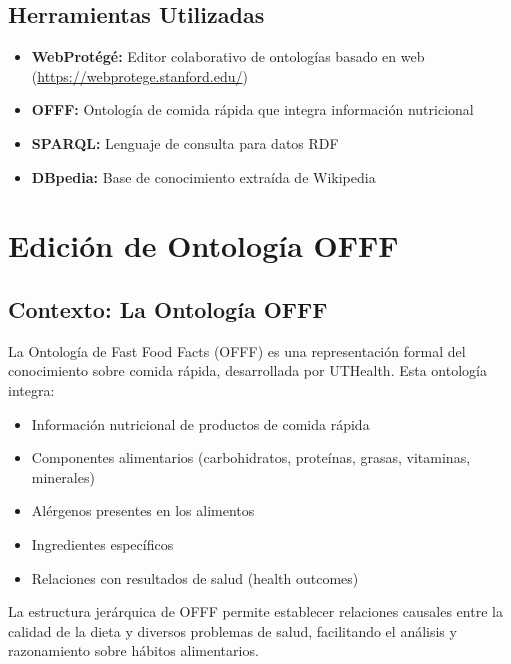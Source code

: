 \documentclass[12pt,a4paper]{article}
\begin{document}
\subsection{Herramientas Utilizadas}

\begin{itemize}
    \item \textbf{WebProtégé:} Editor colaborativo de ontologías basado en web (\url{https://webprotege.stanford.edu/})
    \item \textbf{OFFF:} Ontología de comida rápida que integra información nutricional
    \item \textbf{SPARQL:} Lenguaje de consulta para datos RDF
    \item \textbf{DBpedia:} Base de conocimiento extraída de Wikipedia
\end{itemize}

\section{Edición de Ontología OFFF}

\subsection{Contexto: La Ontología OFFF}

La Ontología de Fast Food Facts (OFFF) es una representación formal del conocimiento sobre comida rápida, desarrollada por UTHealth. Esta ontología integra:

\begin{itemize}
    \item Información nutricional de productos de comida rápida
    \item Componentes alimentarios (carbohidratos, proteínas, grasas, vitaminas, minerales)
    \item Alérgenos presentes en los alimentos
    \item Ingredientes específicos
    \item Relaciones con resultados de salud (health outcomes)
\end{itemize}

La estructura jerárquica de OFFF permite establecer relaciones causales entre la calidad de la dieta y diversos problemas de salud, facilitando el análisis y razonamiento sobre hábitos alimentarios.
\end{document}
